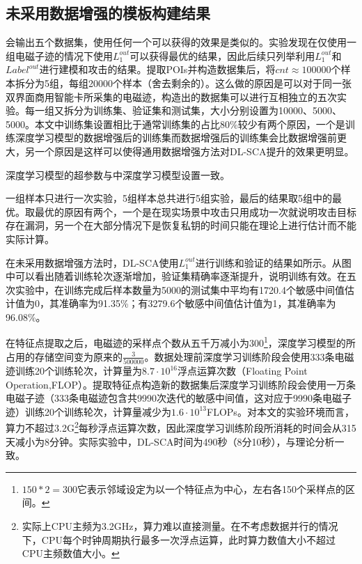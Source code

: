 {{	\subsection{未采用数据增强的模板构建结果}
	会输出五个数据集，使用任何一个可以获得的效果是类似的。实验发现在仅使用一组电磁子迹的情况下使用$L_1^{out}$可以获得最优的结果，因此后续只列举利用$L_1^{out}$和$Label^{out}$进行建模和攻击的结果。提取POIs并构造数据集后，将$cnt\approx100000$个样本拆分为5组，每组20000个样本（舍去剩余的）。这么做的原因是可以对于同一张双界面商用智能卡所采集的电磁迹，构造出的数据集可以进行互相独立的五次实验。每一组又拆分为训练集、验证集和测试集，大小分别设置为10000、5000、5000。本文中训练集设置相比于通常训练集的占比80\%较少有两个原因，一个是训练深度学习模型的数据增强后的训练集而数据增强后的训练集会比数据增强前更大，另一个原因是这样可以使得通用数据增强方法对DL-SCA提升的效果更明显。
	
	深度学习模型的超参数与中深度学习模型设置一致。
	
	一组样本只进行一次实验，5组样本总共进行5组实验，最后的结果取5组中的最优。取最优的原因有两个，一个是在现实场景中攻击只用成功一次就说明攻击目标存在漏洞，另一个在大部分情况下是恢复私钥的时间只能在理论上进行估计而不能实际计算。
	
	在未采用数据增强方法时，DL-SCA使用$L_1^{out}$进行训练和验证的结果如所示。从图中可以看出随着训练轮次逐渐增加，验证集精确率逐渐提升，说明训练有效。在五次实验中，在训练完成后样本数量为5000的测试集中平均有1720.4个敏感中间值估计值为0，其准确率为91.35\%；有3279.6个敏感中间值估计值为1，其准确率为96.08\%。%
	
	在特征点提取之后，电磁迹的采样点个数从五千万减小为300\footnote{$150*2=300$它表示邻域设定为以一个特征点为中心，左右各150个采样点的区间。}，深度学习模型的所占用的存储空间变为原来的$\frac{3}{500000}$。数据处理前深度学习训练阶段会使用333条电磁迹训练20个训练轮次，计算量为$8.7\cdot10^{16}$浮点运算次数（Floating Point Operation,FLOP）。提取特征点构造新的数据集后深度学习训练阶段会使用一万条电磁子迹（333条电磁迹包含共9990次迭代的敏感中间值，这对应于9990条电磁子迹）训练20个训练轮次，计算量减少为$1.6\cdot10^{13}$FLOPs。对本文的实验环境而言，算力不超过3.2G\footnote{实际上CPU主频为3.2GHz，算力难以直接测量。在不考虑数据并行的情况下，CPU每个时钟周期执行最多一次浮点运算，此时算力数值大小不超过CPU主频数值大小。}每秒浮点运算次数，因此深度学习训练阶段所消耗的时间会从315天减小为8分钟。实际实验中，DL-SCA时间为490秒（8分10秒），与理论分析一致。%
	
}}
